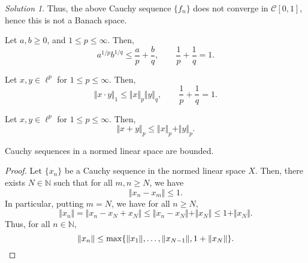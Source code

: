 \documentclass[11pt]{article}
\newcommand{\N}{\mathbb{N}}
\newcommand{\norm}[1]{\Vert #1 \Vert}
\theoremstyle{definition}
\theoremstyle{remark}
\newtheorem*{solution}{Solution}
\begin{document}
\begin{exercise}
\begin{solution}
            Thus, the above Cauchy sequence $\{f_n\}$ does not converge in
            $\mathcal{C}[0, 1]$, hence this is not a Banach space.
        \end{solution}
    \end{exercise}

    \begin{lemma}[Young]
        Let $a, b \geq 0$, and $1 \leq p \leq \infty$. Then, \[
            a^{1 / p} b^{1 / q} \leq \frac{a}{p} + \frac{b}{q}, \qquad
            \frac{1}{p} + \frac{1}{q} = 1.
        \]
    \end{lemma}

    \begin{lemma}[H\"older]
        Let $x, y \in \ell^p$ for $1 \leq p \leq \infty$. Then, \[
            \norm{x\cdot y}_1 \leq \norm{x}_p \norm{y}_q, \qquad
            \frac{1}{p} + \frac{1}{q} = 1.
        \]
    \end{lemma}

    \begin{lemma}[Minkowski]
        Let $x, y \in \ell^p$ for $1 \leq p \leq \infty$. Then, \[
            \norm{x + y}_p \leq \norm{x}_p + \norm{y}_p.
        \]
    \end{lemma}

    \begin{lemma}
        Cauchy sequences in a normed linear space are bounded.
    \end{lemma}
    \begin{proof}
        Let $\{x_n\}$ be a Cauchy sequence in the normed linear space $X$. Then,
        there exists $N \in \N$ such that for all $m, n \geq N$, we have \[
            \norm{x_n - x_m} \leq 1.
        \] In particular, putting $m = N$, we have for all $n \geq N$, \[
            \norm{x_n} = \norm{x_n - x_N + x_N} \leq \norm{x_n - x_N} + \norm{x_N}
            \leq 1 + \norm{x_N}.
        \] Thus, for all $n \in \N$, \[
            \norm{x_n} \leq \max\{\norm{x_1}, \dots, \norm{x_{N - 1}}, 1 +
            \norm{x_N}\}. \qedhere
        \]
    \end{proof}
\end{document}
